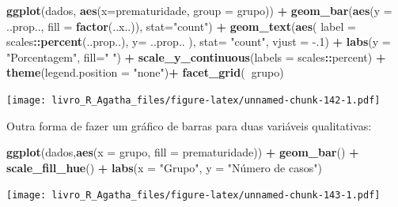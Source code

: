 \documentclass[
]{book}
\newenvironment{Shaded}{\begin{snugshade}}{\end{snugshade}}
\newcommand{\DataTypeTok}[1]{\textcolor[rgb]{0.13,0.29,0.53}{#1}}
\newcommand{\FloatTok}[1]{\textcolor[rgb]{0.00,0.00,0.81}{#1}}
\newcommand{\KeywordTok}[1]{\textcolor[rgb]{0.13,0.29,0.53}{\textbf{#1}}}
\newcommand{\NormalTok}[1]{#1}
\newcommand{\OperatorTok}[1]{\textcolor[rgb]{0.81,0.36,0.00}{\textbf{#1}}}
\newcommand{\StringTok}[1]{\textcolor[rgb]{0.31,0.60,0.02}{#1}}
\begin{document}
\begin{Shaded}
\begin{Highlighting}[]
\KeywordTok{ggplot}\NormalTok{(dados, }\KeywordTok{aes}\NormalTok{(}\DataTypeTok{x=}\NormalTok{prematuridade, }\DataTypeTok{group =}\NormalTok{ grupo))  }\OperatorTok{+}\StringTok{ }
\StringTok{  }\KeywordTok{geom_bar}\NormalTok{(}\KeywordTok{aes}\NormalTok{(}\DataTypeTok{y =}\NormalTok{ ..prop.., }\DataTypeTok{fill =} \KeywordTok{factor}\NormalTok{(..x..)), }\DataTypeTok{stat=}\StringTok{"count"}\NormalTok{) }\OperatorTok{+}
\StringTok{  }\KeywordTok{geom_text}\NormalTok{(}\KeywordTok{aes}\NormalTok{( }\DataTypeTok{label =}\NormalTok{ scales}\OperatorTok{::}\KeywordTok{percent}\NormalTok{(..prop..),}
                 \DataTypeTok{y=}\NormalTok{ ..prop.. ), }\DataTypeTok{stat=} \StringTok{"count"}\NormalTok{, }\DataTypeTok{vjust =} \FloatTok{-.1}\NormalTok{) }\OperatorTok{+}
\StringTok{  }\KeywordTok{labs}\NormalTok{(}\DataTypeTok{y =} \StringTok{"Porcentagem"}\NormalTok{, }\DataTypeTok{fill=}\StringTok{" "}\NormalTok{) }\OperatorTok{+}
\StringTok{  }\KeywordTok{scale_y_continuous}\NormalTok{(}\DataTypeTok{labels =}\NormalTok{ scales}\OperatorTok{::}\NormalTok{percent) }\OperatorTok{+}
\StringTok{  }\KeywordTok{theme}\NormalTok{(}\DataTypeTok{legend.position =} \StringTok{"none"}\NormalTok{)}\OperatorTok{+}
\StringTok{  }\KeywordTok{facet_grid}\NormalTok{(}\OperatorTok{~}\NormalTok{grupo)}
\end{Highlighting}
\end{Shaded}

\texttt{[image: livro\_R\_Agatha\_files/figure-latex/unnamed-chunk-142-1.pdf]}

Outra forma de fazer um gráfico de barras para duas variáveis qualitativas:

\begin{Shaded}
\begin{Highlighting}[]
\KeywordTok{ggplot}\NormalTok{(dados,}\KeywordTok{aes}\NormalTok{(}\DataTypeTok{x =}\NormalTok{ grupo, }\DataTypeTok{fill =}\NormalTok{ prematuridade)) }\OperatorTok{+}
\StringTok{  }\KeywordTok{geom_bar}\NormalTok{() }\OperatorTok{+}
\StringTok{  }\KeywordTok{scale_fill_hue}\NormalTok{() }\OperatorTok{+}
\StringTok{  }\KeywordTok{labs}\NormalTok{(}\DataTypeTok{x =} \StringTok{"Grupo"}\NormalTok{, }\DataTypeTok{y =} \StringTok{"Número de casos"}\NormalTok{)}
\end{Highlighting}
\end{Shaded}

\texttt{[image: livro\_R\_Agatha\_files/figure-latex/unnamed-chunk-143-1.pdf]}
\end{document}
